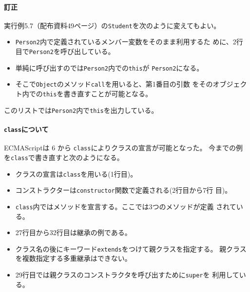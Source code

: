 

\paragraph{訂正}

実行例5.7（配布資料49ページ）の\Verb+Student+を次のように変えてもよい。

\begin{itemize}
 \item \Verb+Person2+内で定義されているメンバー変数をそのまま利用するた
			 めに、2行目で\Verb+Person2+を呼び出している。
 \item 単純に呼び出すのでは\Verb+Person2+内での\Verb+this+が
			 \Verb+Person2+になる。
 \item そこで\Verb+Object+のメソッド\Verb+call+を用いると、第1番目の引数
			 をそのオブジェクト内での\Verb+this+を書き直すことが可能となる。
\end{itemize}
このリストでは\Verb+Person2+内で\Verb+this+を出力している。

\paragraph{\texttt{class}について}

ECMAScriptは 6 から \Verb+class+によりクラスの宣言が可能となった。
今までの例を\Verb+class+で書き直すと次のようになる。
\begin{itemize}
 \item クラスの宣言は\Verb+class+を用いる(1行目)。
 \item コンストラクターは\Verb+constructor+関数で定義される(2行目から7行
			 目)。
 \item \Verb+class+内ではメソッドを宣言する。ここでは3つのメソッドが定義
			 されている。
 \item 27行目から32行目は継承の例である。
 \item クラス名の後にキーワード\Verb+extends+をつけて親クラスを指定する。
			 親クラスを複数指定する多重継承はできない。
 \item 29行目では親クラスのコンストラクタを呼び出すために\Verb+super+を
			 利用している。
\end{itemize}
